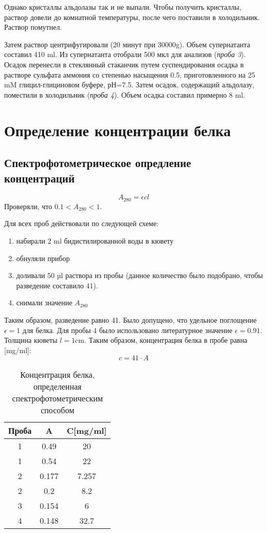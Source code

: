 Однако кристаллы альдолазы так и не выпали.
Чтобы получить кристаллы, раствор довели до комнатной температуры,
после чего поставили в холодильник. Раствор помутнел.

Затем раствор центрифугировали (20 минут при 30000g).
Объем супернатанта составил 410 ml.
Из супернатанта отобрали 500 мкл для анализов (\emph{проба 3}).
Осадок перенесли в стеклянный стаканчик путем суспендирования осадка
в растворе сульфата аммония со степенью насыщения 0.5,
приготовленного на 25 mM глицил-глициновом буфере, рН=7.5.
Затем осадок, содержащий альдолазу, поместили в холодильник (\emph{проба 4}).
Объем осадка составил примерно 8 ml.

\section{Определение концентрации белка}

\subsection{Спектрофотометрическое опредление концентраций}
$$ A_{280} = \epsilon c l $$
Проверяли, что $ 0.1 < A_{280} < 1 $.

Для всех проб действовали по следующей схеме:
\begin{enumerate}
\item набирали 2 ml бидистилированной воды в кювету
\item обнуляли прибор
\item доливали 50 µl раствора из пробы
    (данное количество было подобрано, чтобы разведение составило 41).
\item снимали значение $A_{280}$
\end{enumerate}
Таким образом, разведение равно 41.
Было допущено, что удельное поглощение $\epsilon = 1$ для белка.
Для пробы 4 было использовано литературное значение $\epsilon = 0.91$.
Толщина кюветы $l = 1 \text{cm}$.
Таким образом, концентрация белка в пробе равна [mg/ml]:
$$ c=41 \cdot A $$

\begin{table}[htbp]
\caption{Концентрация белка, определенная спектрофотометрическим способом}
\begin{tabular}{|c|c|c|}
\hline
Проба & A & C[mg/ml] \\
\hline
1 & 0.49 & 20 \\
1 & 0.54 & 22 \\
\hline
2 & 0.177 & 7.257 \\
2 & 0.2 & 8.2 \\
\hline
3 & 0.154 & 6 \\
\hline
4 & 0.148 & 32.7 \\
\hline
\end{tabular}
\end{table}

